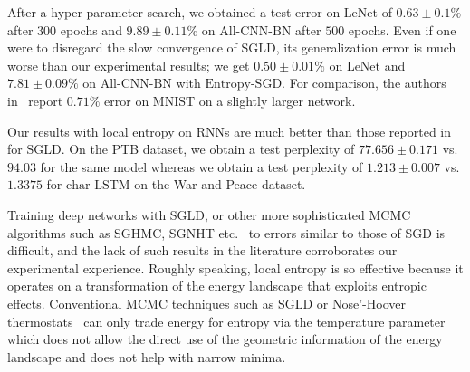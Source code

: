 \documentclass[10pt]{article}
\newcommand{\entropysgd}{\mathrm{Entropy}\textrm{-}\mathrm{SGD}}
\newcommand{\charlstm}{\textrm{char-LSTM}}
\newcommand{\lenet}{\textrm{LeNet}}
\newcommand{\allcnn}{\textrm{All-CNN-BN}}
\begin{document}
\begin{appendices}
After a hyper-parameter search, we obtained a test error on $\lenet$ of $0.63 \pm 0.1\%$ after $300$ epochs and $9.89 \pm 0.11\%$ on $\allcnn$ after $500$ epochs. Even if one were to disregard the slow convergence of SGLD, its generalization error is much worse than our experimental results; we get $0.50 \pm 0.01 \%$ on $\lenet$ and $7.81 \pm 0.09 \%$ on $\allcnn$ with $\entropysgd$. For comparison, the authors in~\citet{chen2015bridging} report $0.71\%$ error on MNIST on a slightly larger network.

Our results with local entropy on RNNs are much better than those reported in~\citet{gan2016scalable} for SGLD. On the PTB dataset, we obtain a test perplexity of $77.656 \pm 0.171$ vs. $94.03$ for the same model whereas we obtain a test perplexity of $1.213 \pm 0.007$ vs. $1.3375$ for $\charlstm$ on the War and Peace dataset.

Training deep networks with SGLD, or other more sophisticated MCMC algorithms such as SGHMC, SGNHT etc.~\citep{chen2014stochastic,neal2011mcmc} to errors similar to those of SGD is difficult, and the lack of such results in the literature corroborates our experimental experience. Roughly speaking, local entropy is so effective because it operates on a transformation of the energy landscape that exploits entropic effects. Conventional MCMC techniques such as SGLD or Nose'-Hoover thermostats~\citep{ding2014bayesian} can only trade energy for entropy via the temperature parameter which does not allow the direct use of the geometric information of the energy landscape and does not help with narrow minima.

\end{appendices}
\end{document}

